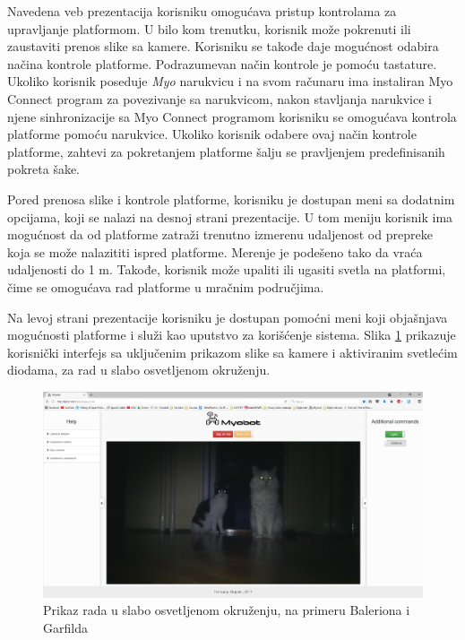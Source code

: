 \documentclass[12pt,a4paper]{report}
\begin{document}
Navedena veb prezentacija korisniku omogućava pristup kontrolama za upravljanje platformom. U bilo kom trenutku, korisnik može pokrenuti ili zaustaviti prenos slike sa kamere. Korisniku se takođe daje mogućnost odabira načina kontrole platforme. Podrazumevan način kontrole je pomoću tastature. Ukoliko korisnik poseduje \textit{Myo} narukvicu i na svom računaru ima instaliran Myo Connect program za povezivanje sa narukvicom, nakon stavljanja narukvice i njene sinhronizacije sa Myo Connect programom korisniku se omogućava kontrola platforme pomoću narukvice. Ukoliko korisnik odabere ovaj način kontrole platforme, zahtevi za pokretanjem platforme šalju se pravljenjem predefinisanih pokreta šake. 

Pored prenosa slike i kontrole platforme, korisniku je dostupan meni sa dodatnim opcijama, koji se nalazi na desnoj strani prezentacije. U tom meniju korisnik ima mogućnost da od platforme zatraži trenutno izmerenu udaljenost od prepreke koja se može nalazititi ispred platforme. Merenje je podešeno tako da vraća udaljenosti do 1 m. Takođe, korisnik može upaliti ili ugasiti svetla na platformi, čime se omogućava rad platforme u mračnim područjima.

Na levoj strani prezentacije korisniku je dostupan pomoćni meni koji objašnjava mogućnosti platforme i služi kao uputstvo za korišćenje sistema. Slika \ref{fig:cats} prikazuje korisnički interfejs sa uključenim prikazom slike sa kamere i aktiviranim svetlećim diodama, za rad u slabo osvetljenom okruženju.

\begin{figure}[H]
    \centering
    \includegraphics[width=16cm, keepaspectratio]{img/cats.png}
    \caption{Prikaz rada u slabo osvetljenom okruženju, na primeru Baleriona i Garfilda}
    \label{fig:cats}
\end{figure}
\end{document}
